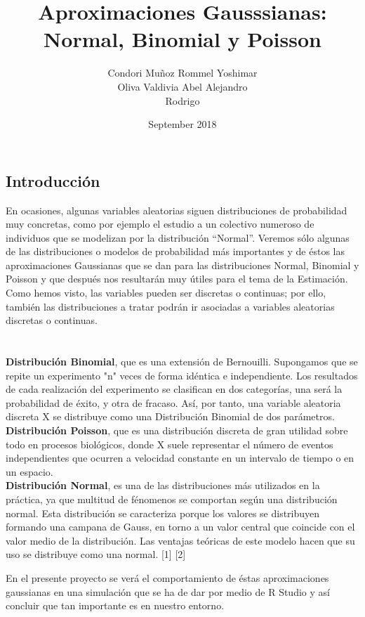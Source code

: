 \documentclass[12pt,a4paper]{article}
\title{Aproximaciones Gausssianas:\\Normal, Binomial y Poisson}
\author{Condori Muñoz Rommel Yoshimar\\Oliva Valdivia Abel Alejandro\\Rodrigo}
\date{September 2018}
\begin{document}
\maketitle
\begin{multicols}{2}
\section{Introducción}
    
    En ocasiones, algunas variables aleatorias siguen distribuciones de probabilidad muy concretas, como por ejemplo el estudio a un colectivo numeroso de individuos que se modelizan por la distribución “Normal”. Veremos sólo algunas de las distribuciones o modelos de probabilidad más importantes y de éstos las aproximaciones Gaussianas que se dan para las distribuciones Normal, Binomial y Poisson   y que después nos resultarán muy útiles para el tema de la Estimación.
    Como hemos visto, las variables pueden ser discretas o continuas; por ello, también las distribuciones a tratar podrán ir asociadas a variables aleatorias discretas o continuas.\\
    
    \\\\ \textbf{Distribución Binomial}, que es una extensión de Bernouilli. Supongamos que se repite un experimento "n" veces  de forma idéntica e independiente. Los resultados  de cada  realización  del experimento  se clasifican  en dos categorías, una será la probabilidad de éxito,  y otra de fracaso. Así, por tanto, una variable aleatoria discreta X se distribuye como una Distribución Binomial  de dos parámetros.
    \\ \textbf{Distribución Poisson}, que es una distribución discreta de gran utilidad  sobre todo en procesos biológicos, donde X suele representar el número  de eventos independientes que ocurren a velocidad constante en un intervalo de tiempo o en un espacio.
    \\ \textbf{Distribución Normal}, es una de las distribuciones más utilizados  en la práctica, ya que  multitud  de fénomenos se comportan según  una distribución normal. Esta distribución se caracteriza porque los valores  se distribuyen  formando una campana de Gauss, en torno  a un valor central que coincide con el valor  medio de la distribución. Las ventajas teóricas de este modelo hacen que su uso se distribuye como una normal.
    [1] [2]
    
    En el presente proyecto se verá el comportamiento de éstas aproximaciones gaussianas en una simulación  que se ha de dar por medio de R Studio y así concluir que tan importante es en nuestro entorno.
    

\end{multicols}
\end{document}
